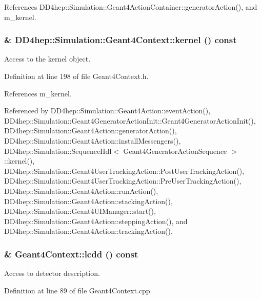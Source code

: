 References DD4hep::Simulation::Geant4ActionContainer::generatorAction(), and m\_\-kernel.\hypertarget{class_d_d4hep_1_1_simulation_1_1_geant4_context_a68417b8caff336526775843e0b65cd90}{
\subsubsection[{kernel}]{\& DD4hep::Simulation::Geant4Context::kernel () const}}
\label{class_d_d4hep_1_1_simulation_1_1_geant4_context_a68417b8caff336526775843e0b65cd90}


Access to the kernel object. 

Definition at line 198 of file Geant4Context.h.

References m\_\-kernel.

Referenced by DD4hep::Simulation::Geant4Action::eventAction(), DD4hep::Simulation::Geant4GeneratorActionInit::Geant4GeneratorActionInit(), DD4hep::Simulation::Geant4Action::generatorAction(), DD4hep::Simulation::Geant4Action::installMessengers(), DD4hep::Simulation::SequenceHdl$<$ Geant4GeneratorActionSequence $>$::kernel(), DD4hep::Simulation::Geant4UserTrackingAction::PostUserTrackingAction(), DD4hep::Simulation::Geant4UserTrackingAction::PreUserTrackingAction(), DD4hep::Simulation::Geant4Action::runAction(), DD4hep::Simulation::Geant4Action::stackingAction(), DD4hep::Simulation::Geant4UIManager::start(), DD4hep::Simulation::Geant4Action::steppingAction(), and DD4hep::Simulation::Geant4Action::trackingAction().\hypertarget{class_d_d4hep_1_1_simulation_1_1_geant4_context_a2d955e79c4f81a5afd18dbdc5f067176}{
\subsubsection[{lcdd}]{ \& Geant4Context::lcdd () const}}
\label{class_d_d4hep_1_1_simulation_1_1_geant4_context_a2d955e79c4f81a5afd18dbdc5f067176}


Access to detector description. 

Definition at line 89 of file Geant4Context.cpp.

